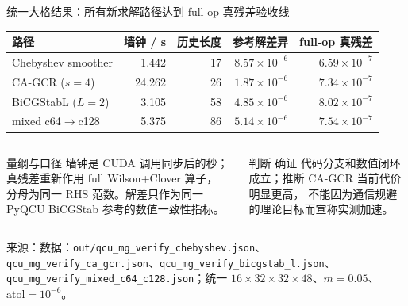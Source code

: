 \documentclass[UTF8,aspectratio=169,11pt]{ctexbeamer}
\newcommand{\source}[1]{%
  \vspace{0.06em}\par{\raggedright\scriptsize\color{muted}来源：#1\par}}
\newcommand{\code}[1]{\nolinkurl{#1}}
\newcommand{\verified}{\textcolor{evidence}{确证}}
\newcommand{\inferred}{\textcolor{accent}{推断}}
\begin{document}
\begin{frame}[t]{统一大格结果：所有新求解路径达到 full-op 真残差验收线}
  \begin{center}
    \small
    \begin{tabular}{@{}P{0.25\textwidth}rrrr@{}}
      \toprule
      路径 & 墙钟 / s & 历史长度 & 参考解差异 & full-op 真残差 \\
      \midrule
      Chebyshev smoother & 1.442 & 17 & $8.57\times10^{-6}$ & $6.59\times10^{-7}$ \\
      CA-GCR ($s=4$) & 24.262 & 26 & $1.87\times10^{-6}$ & $7.34\times10^{-7}$ \\
      BiCGStabL ($L=2$) & 3.105 & 58 & $4.85\times10^{-6}$ & $8.02\times10^{-7}$ \\
      mixed c64$\to$c128 & 5.375 & 86 & $5.14\times10^{-6}$ & $7.54\times10^{-7}$ \\
      \bottomrule
    \end{tabular}
  \end{center}
  \vspace{0.2em}
  \begin{columns}[T,totalwidth=\textwidth]
    \begin{column}{0.48\textwidth}
      \begin{block}{量纲与口径}
        \small
        墙钟是 CUDA 调用同步后的秒；真残差重新作用 full Wilson+Clover 算子，
        分母为同一 RHS 范数。解差只作为同一 PyQCU BiCGStab 参考的数值一致性指标。
      \end{block}
    \end{column}
    \begin{column}{0.48\textwidth}
      \begin{block}{判断}
        \small
        \verified{} 代码分支和数值闭环成立；\inferred{} CA-GCR 当前代价明显更高，
        不能因为通信规避的理论目标而宣称实测加速。
      \end{block}
    \end{column}
  \end{columns}
  \source{数据：\code{out/qcu_mg_verify_chebyshev.json}、\code{qcu_mg_verify_ca_gcr.json}、\code{qcu_mg_verify_bicgstab_l.json}、\code{qcu_mg_verify_mixed_c64_c128.json}；统一 $16\times32\times32\times48$、$m=0.05$、$\mathrm{atol}=10^{-6}$。}
\end{frame}
\end{document}
